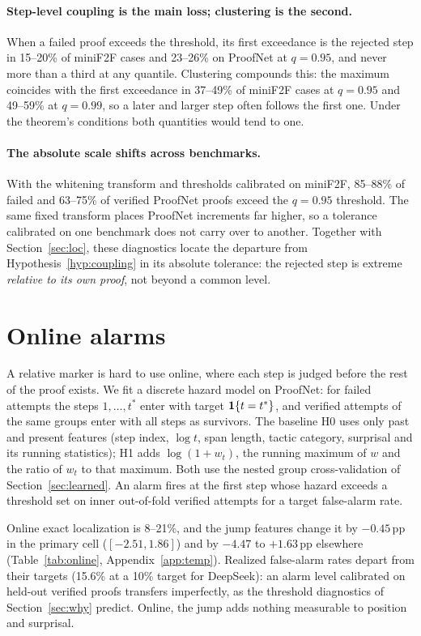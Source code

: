\paragraph{Step-level coupling is the main loss; clustering is the second.} When a failed proof exceeds the threshold, its first exceedance is the rejected step in 15--20\% of miniF2F cases and 23--26\% on ProofNet at $q=0.95$, and never more than a third at any quantile. Clustering compounds this: the maximum coincides with the first exceedance in 37--49\% of miniF2F cases at $q=0.95$ and 49--59\% at $q=0.99$, so a later and larger step often follows the first one. Under the theorem's conditions both quantities would tend to one.

\paragraph{The absolute scale shifts across benchmarks.} With the whitening transform and thresholds calibrated on miniF2F, 85--88\% of failed and 63--75\% of verified ProofNet proofs exceed the $q=0.95$ threshold. The same fixed transform places ProofNet increments far higher, so a tolerance calibrated on one benchmark does not carry over to another. Together with Section~\ref{sec:loc}, these diagnostics locate the departure from Hypothesis~\ref{hyp:coupling} in its absolute tolerance: the rejected step is extreme \emph{relative to its own proof}, not beyond a common level.

\section{Online alarms}\label{sec:online}

A relative marker is hard to use online, where each step is judged before the rest of the proof exists. We fit a discrete hazard model on ProofNet: for failed attempts the steps $1,\dots,t^*$ enter with target $\mathbf{1}\{t=t^*\}$, and verified attempts of the same groups enter with all steps as survivors. The baseline H0 uses only past and present features (step index, $\log t$, span length, tactic category, surprisal and its running statistics); H1 adds $\log(1+w_t)$, the running maximum of $w$ and the ratio of $w_t$ to that maximum. Both use the nested group cross-validation of Section~\ref{sec:learned}. An alarm fires at the first step whose hazard exceeds a threshold set on inner out-of-fold verified attempts for a target false-alarm rate.

Online exact localization is 8--21\%, and the jump features change it by $-0.45$\,pp in the primary cell ($[-2.51, 1.86]$) and by $-4.47$ to $+1.63$\,pp elsewhere (Table~\ref{tab:online}, Appendix~\ref{app:temp}). Realized false-alarm rates depart from their targets (15.6\% at a 10\% target for DeepSeek): an alarm level calibrated on held-out verified proofs transfers imperfectly, as the threshold diagnostics of Section~\ref{sec:why} predict. Online, the jump adds nothing measurable to position and surprisal.


